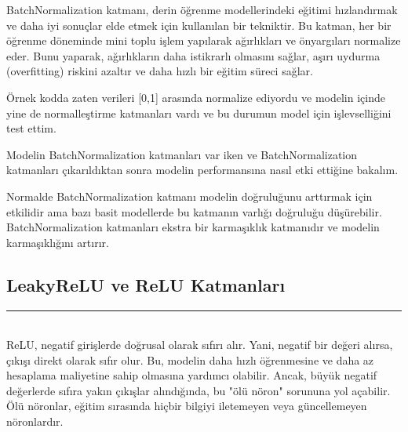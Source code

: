 \documentclass{article}
\begin{document}
\noindent BatchNormalization katmanı, derin öğrenme modellerindeki eğitimi hızlandırmak ve daha iyi sonuçlar elde etmek için kullanılan bir tekniktir. Bu katman, her bir öğrenme döneminde mini toplu işlem yapılarak ağırlıkları ve önyargıları normalize eder. Bunu yaparak, ağırlıkların daha istikrarlı olmasını sağlar, aşırı uydurma (overfitting) riskini azaltır ve daha hızlı bir eğitim süreci sağlar.\vspace{0.5cm}

\noindent Örnek kodda zaten verileri [0,1] arasında normalize ediyordu ve modelin içinde yine de normalleştirme katmanları vardı ve bu durumun model için işlevselliğini test ettim. \vspace{0.5cm}

\noindent Modelin BatchNormalization katmanları var iken ve BatchNormalization katmanları çıkarıldıktan sonra modelin performansına nasıl etki ettiğine bakalım. \vspace{0.5cm}

\renewcommand{\tablename}{Tablo}

\begin{table}[h!]
    \centering
    \label{tab:ModelDoğrulukları}
    \caption{BatchNormalization Katmanının Etkisi}
\end{table}

\noindent Normalde BatchNormalization katmanı modelin doğruluğunu arttırmak için etkilidir ama bazı basit modellerde  bu katmanın varlığı doğruluğu düşürebilir. BatchNormalization katmanları ekstra bir karmaşıklık katmanıdır ve modelin karmaşıklığını artırır.\vspace{0.5cm}


\subsection{LeakyReLU ve ReLU Katmanları}
\rule{\textwidth}{0.5pt}\\[10pt]

\noindent ReLU\cite{Baeldung}, negatif girişlerde doğrusal olarak sıfırı alır. Yani, negatif bir değeri alırsa, çıkışı direkt olarak sıfır olur. Bu, modelin daha hızlı öğrenmesine ve daha az hesaplama maliyetine sahip olmasına yardımcı olabilir. Ancak, büyük negatif değerlerde sıfıra yakın çıkışlar alındığında, bu "ölü nöron" sorununa yol açabilir. Ölü nöronlar, eğitim sırasında hiçbir bilgiyi iletemeyen veya güncellemeyen nöronlardır. \vspace{0.5cm}
\end{document}
